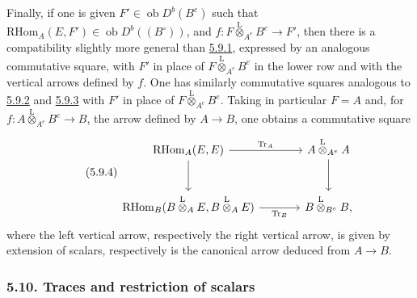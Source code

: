 \documentclass[11pt]{article}
\newcommand{\ob}{\operatorname{ob}}
\providecommand{\RHom}{\mathrm{RHom}}
\providecommand{\Tr}{\operatorname{Tr}}
\providecommand{\Tr}{\operatorname{Tr}}
\providecommand{\lten}{\overset{\mathrm L}{\otimes}}
\providecommand{\Tr}{\operatorname{Tr}}
\providecommand{\RHom}{\mathrm{RHom}}
\providecommand{\ob}{\operatorname{ob}}
\providecommand{\lten}{\overset{\mathrm L}{\otimes}}
\providecommand{\RHom}{\mathrm R\mathcal{H}om}
\providecommand{\lten}{\overset{\mathrm L}{\otimes}}
\providecommand{\Tr}{\operatorname{Tr}}
\providecommand{\lten}{\overset{\mathrm L}{\otimes}}
\providecommand{\lten}{\overset{\mathrm L}{\otimes}}
\providecommand{\lten}{\overset{\mathrm L}{\otimes}}
\providecommand{\RHom}{\mathrm{RHom}}
\providecommand{\Tr}{\operatorname{Tr}}
\providecommand{\lten}{\overset{\mathrm L}{\otimes}}
\begin{document}
Finally, if one is given $F'\in\ob D^b(B^e)$ such that $\RHom_A(E,F')\in\ob D^b((B^\circ))$, and $f:F\lten_{A^e}B^e\to F'$, then there is a compatibility slightly more general than \hyperref[sga5:IIIB:equation:5.9.1]{5.9.1}, expressed by an analogous commutative square, with $F'$ in place of $F\lten_{A^e}B^e$ in the lower row and with the vertical arrows defined by $f$. One has similarly commutative squares analogous to \hyperref[sga5:IIIB:equation:5.9.2]{5.9.2} and \hyperref[sga5:IIIB:equation:5.9.3]{5.9.3} with $F'$ in place of $F\lten_{A^e}B^e$. Taking in particular $F=A$ and, for $f:A\lten_{A^e}B^e\to B$, the arrow defined by $A\to B$, one obtains a commutative square
\begin{equation}\tag{5.9.4}\label{sga5:IIIB:equation:5.9.4}
\begin{tikzcd}[column sep=large,row sep=large]
\RHom_A(E,E) \arrow[r,"\Tr_A"] \arrow[d] & A\lten_{A^e}A \arrow[d]\\
\RHom_B(B\lten_AE,B\lten_AE) \arrow[r,"\Tr_B"'] & B\lten_{B^e}B,
\end{tikzcd}
\end{equation}
where the left vertical arrow, respectively the right vertical arrow, is given by extension of scalars, respectively is the canonical arrow deduced from $A\to B$.

\subsubsection*{5.10. Traces and restriction of scalars}\label{sga5:IIIB:subsubsection:5.10}
\end{document}
